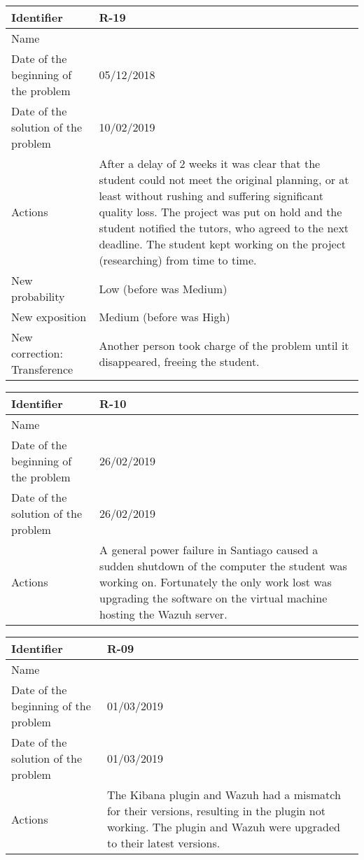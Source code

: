 \begin{table}[H]
	\begin{tabularx}{\textwidth}{|l|X|}
		\hline
		\rowcolor{gray!30}
		Identifier & \textbf{R-19} \\ \hline
		Name & \Rdiecinueve \\ \hline
		Date of the beginning of the problem & 05/12/2018 \\ \hline
		Date of the solution of the problem & 10/02/2019 \\ \hline
		Actions & After a delay of 2 weeks it was clear that the student could not meet the original planning, or at least without rushing and suffering significant quality loss. \linej
			The project was put on hold and the student notified the tutors, who agreed to the next deadline. \linej
			The student kept working on the project (researching) from time to time. \\ \hline
		New probability & Low (before was Medium) \\ \hline
		New exposition & Medium (before was High) \\ \hline
		New correction: Transference &
			Another person took charge of the problem until it disappeared, freeing the student.
		\\ \hline
	\end{tabularx}
\end{table}
\begin{table}[H]
	\begin{tabularx}{\textwidth}{|l|X|}
		\hline
		\rowcolor{gray!30}
		Identifier & \textbf{R-10} \\ \hline
		Name & \Rdiez \\ \hline
		Date of the beginning of the problem & 26/02/2019 \\ \hline
		Date of the solution of the problem & 26/02/2019 \\ \hline
		Actions & A general power failure in Santiago caused a sudden shutdown of the computer the student was working on. \linej
		Fortunately the only work lost was upgrading the software on the virtual machine hosting the Wazuh server.\\ \hline
	\end{tabularx}
\end{table}
\begin{table}[H]
	\begin{tabularx}{\textwidth}{|l|X|}
		\hline
		\rowcolor{gray!30}
		Identifier & \textbf{R-09} \\ \hline
		Name & \Rnueve \\ \hline
		Date of the beginning of the problem & 01/03/2019 \\ \hline
		Date of the solution of the problem & 01/03/2019 \\ \hline
		Actions & The Kibana plugin and Wazuh had a mismatch for their versions, resulting in the plugin not working. \linej
		The plugin and Wazuh were upgraded to their latest versions. \\ \hline
	\end{tabularx}
\end{table}
